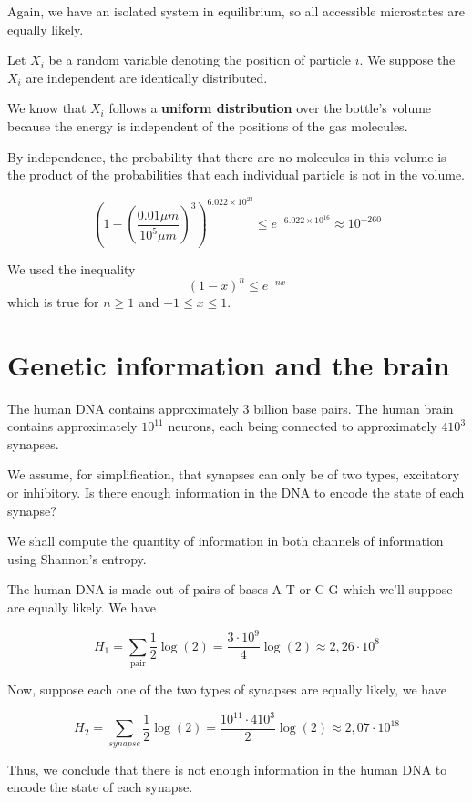 \documentclass[english]{article}
\begin{document}
	Again, we have an isolated system in equilibrium, so all accessible microstates are equally likely.
	
	Let $X_i$ be a random variable denoting the position of particle $i$. We suppose the $X_i$ are independent are identically distributed.
	
	We know that $X_i$ follows a \textbf{uniform distribution} over the bottle's volume because the energy is independent of the positions of the gas molecules.
	
	 By independence, the probability that there are no molecules in this volume is the product of the probabilities that each individual particle is not in the volume.
	 
	 $$ \left( 1 - \left(\frac{0.01 \mu m}{10^5 \mu m}\right)^3 \right)^{6.022 \times 10^{23}} \leq e^{-6.022 \times 10^{16}} \approx 10^{-260} $$
	 
	 \begin{tcolorbox}[colback=yellow!5!white,colframe=yellow!75!black]
	 	We used the inequality
	 	$$ (1-x)^n \leq e^{-nx} $$
	 	which is true for $ n \geq 1$ and $-1 \leq x \leq 1$.
	 \end{tcolorbox}

	\section{Genetic information and the brain}
	\begin{tcolorbox}[colback=blue!5!white,colframe=blue!75!black]
		\quad The human DNA contains approximately $3$ billion base pairs. The human brain contains approximately $10^{11}$ neurons, each being connected to approximately $410^3$ synapses.
		
		\quad We assume, for simplification, that synapses can only be of two types, excitatory or inhibitory. Is there enough information in the DNA to encode the state of each synapse?
	\end{tcolorbox}
	
	We shall compute the quantity of information in both channels of information using Shannon's entropy.
	
	The human DNA is made out of pairs of bases A-T or C-G which we'll suppose are equally likely. We have

	$$ H_1 = \sum_{\text{pair}} \frac{1}{2} \log(2) = \frac{3 \cdot 10^9}{4} \log(2) \approx 2,26 \cdot 10^{8} $$
	
	Now, suppose each one of the two types of synapses are equally likely, we have

	$$ H_2 = \sum_{synapse} \frac{1}{2} \log(2) = \frac{10^{11} \cdot 410^3}{2}\log(2) \approx 2,07 \cdot 10^{18}$$
	
	Thus, we conclude that there is not enough information in the human DNA to encode the state of each synapse.
	
\end{document}
